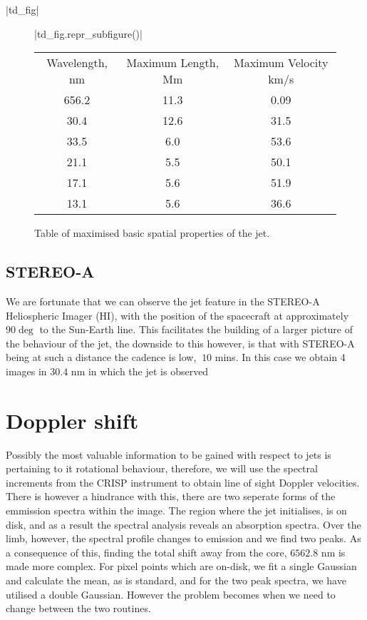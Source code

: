 \documentclass{emulateapj}
\begin{document}
\py[T-D-plots]|td_fig|

\begin{figure}
	\centering
	\py[T-D-plots]|td_fig.repr_subfigure()|
	~
	\begin{subtable}[b]{0.5\textwidth}
		\centering
		\begin{tabular}{ccc}
		Wavelength, nm & Maximum Length, Mm & Maximum Velocity km/s \\
		656.2 & 11.3 & 0.09 \\
		30.4 & 12.6 & 31.5 \\
		33.5 & 6.0 & 53.6 \\
		21.1 & 5.5 & 50.1 \\
		17.1 & 5.6 & 51.9 \\
		13.1 & 5.6 & 36.6 \\
		\end{tabular}
		\caption{Table of maximised basic spatial properties of the jet.}
	\end{subtable}
\end{figure}

\subsection{STEREO-A}
We are fortunate that we can observe the jet feature in the STEREO-A Heliospheric Imager (HI), with the position of the spacecraft at approximately $90\deg$ to the Sun-Earth line.
This facilitates the building of a larger picture of the behaviour of the jet, the downside to this however, is that with STEREO-A being at such a distance the cadence is low, $~10$ mins.
In this case we obtain 4 images in $30.4$ nm in which the jet is observed



\section{Doppler shift}
\label{dop_shift_sect}

Possibly the most valuable information to be gained with respect to jets is pertaining to it rotational behaviour, therefore, we will use the spectral increments from the CRISP instrument to obtain line of sight Doppler velocities.
There is however a hindrance with this, there are two seperate forms of the emmission spectra within the image.
The region where the jet initialises, is on disk, and as a result the spectral analysis reveals an absorption spectra.
Over the limb, however, the spectral profile changes to emission and we find two peaks.
As a consequence of this, finding the total shift away from the core, $6562.8$ nm is made more complex.
For pixel points which are on-disk, we fit a single Gaussian and calculate the mean, as is standard, and for the two peak spectra, we have utilised a double Gaussian.
However the problem becomes when we need to change between the two routines.
\end{document}
